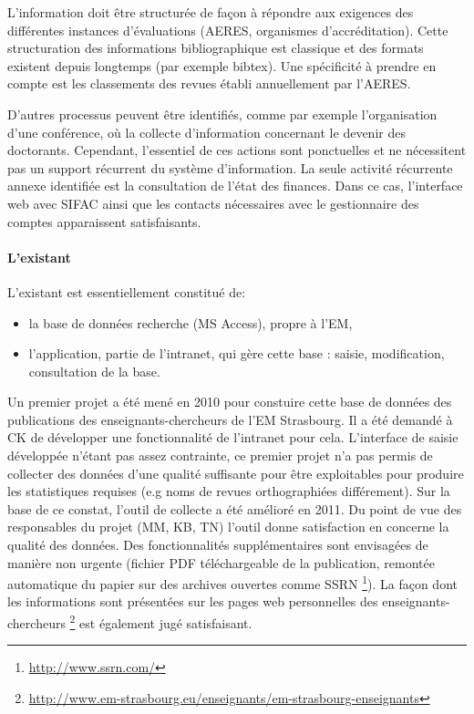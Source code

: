 \documentclass{book}
\begin{document}
L'information doit être structurée de façon à répondre aux exigences des 
différentes instances d'évaluations (AERES, organismes d'accréditation).
Cette structuration des informations bibliographique est classique et des
formats existent depuis longtemps (par exemple bibtex). Une spécificité
à prendre en compte est les classements des revues établi annuellement par 
l'AERES.

D'autres processus peuvent être identifiés, comme par exemple l'organisation
d'une conférence, où la collecte d'information concernant le devenir des
doctorants. Cependant, l'essentiel de ces actions sont ponctuelles et ne 
nécessitent pas un support récurrent du système d'information. La seule 
activité récurrente annexe identifiée est la consultation de l'état des 
finances. Dans ce cas, l'interface web avec SIFAC ainsi que les contacts 
nécessaires avec le gestionnaire des comptes apparaissent satisfaisants.



\paragraph{L'existant}
L'existant est essentiellement constitué de:
\begin{itemize}
\item la base de données recherche (MS Access), propre à l'EM,
\item l'application, partie de l'intranet, qui gère cette base : saisie, 
modification, consultation de la base.
\end{itemize}
Un premier projet a été mené en 2010 pour constuire cette base de données des
publications des enseignants-chercheurs de l'EM Strasbourg. Il a été demandé à 
CK de développer une fonctionnalité de l'intranet pour cela. L'interface de 
saisie développée n'étant pas assez contrainte, ce premier projet n'a pas 
permis de collecter des données d'une qualité suffisante pour être exploitables
pour produire les statistiques requises (e.g noms de revues orthographiées 
différement). Sur la base de ce constat, l'outil de collecte a été amélioré en 
2011. Du point de vue des responsables du projet (MM, KB, TN) l'outil donne 
satisfaction en concerne la qualité des données. Des fonctionnalités supplémentaires 
sont envisagées de manière non urgente (fichier PDF téléchargeable de la publication,
remontée automatique du papier sur des archives ouvertes comme SSRN%
\footnote{\url{ http://www.ssrn.com/}}).
La façon dont les informations sont présentées sur les pages web personnelles
des enseignants-chercheurs%
\footnote{\url{http://www.em-strasbourg.eu/enseignants/em-strasbourg-enseignants}}
est également jugé satisfaisant.
\end{document}
